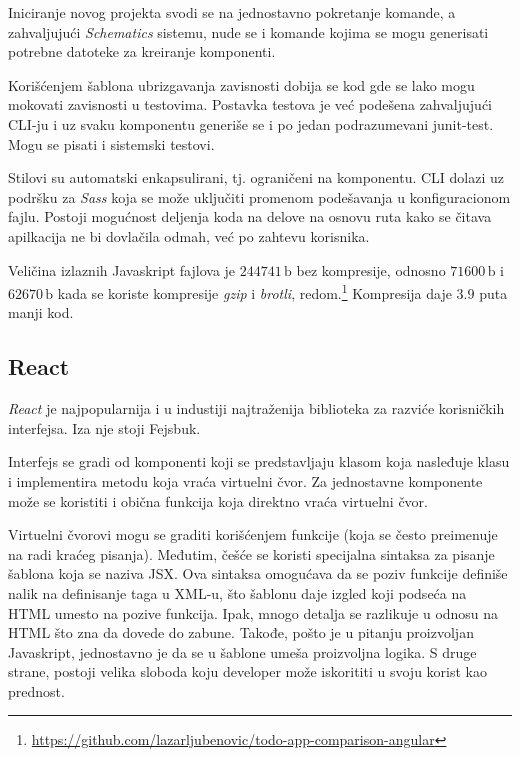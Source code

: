 Iniciranje novog projekta svodi se na jednostavno pokretanje komande, a zahvaljujući \textsl{Schematics} sistemu, nude se i komande kojima se mogu generisati potrebne datoteke za kreiranje komponenti.

Korišćenjem šablona ubrizgavanja zavisnosti dobija se kod gde se lako mogu mokovati zavisnosti u testovima.
Postavka testova je već podešena zahvaljujući CLI-ju i uz svaku komponentu generiše se i po jedan podrazumevani junit-test.
Mogu se pisati i sistemski testovi.

Stilovi su automatski enkapsulirani, tj. ograničeni na komponentu.
CLI dolazi uz podršku za \textsl{Sass} koja se može uključiti promenom podešavanja u konfiguracionom fajlu.
Postoji mogućnost deljenja koda na delove na osnovu ruta kako se čitava apilkacija ne bi dovlačila odmah, već po zahtevu korisnika.

Veličina izlaznih Javaskript fajlova je $244741\,\mathrm{b}$ bez kompresije, odnosno $71600\,\mathrm{b}$ i $62670\,\mathrm{b}$ kada se koriste kompresije \textsl{gzip} i \textsl{brotli}, redom.\footnote{\url{https://github.com/lazarljubenovic/todo-app-comparison-angular}} Kompresija daje $3.9$ puta manji kod.

\subsection{React}

\textsl{React} je najpopularnija i u industiji najtraženija biblioteka za razviće korisničkih interfejsa.
Iza nje stoji Fejsbuk.

Interfejs se gradi od komponenti koji se predstavljaju klasom koja nasleđuje klasu  i implementira metodu  koja vraća virtuelni čvor.
Za jednostavne komponente može se koristiti i obična funkcija koja direktno vraća virtuelni čvor.

Virtuelni čvorovi mogu se graditi korišćenjem funkcije  (koja se često preimenuje na  radi kraćeg pisanja).
Međutim, češće se koristi specijalna sintaksa za pisanje šablona koja se naziva JSX.
Ova sintaksa omogućava da se poziv funkcije definiše nalik na definisanje taga u XML-u, što šablonu daje izgled koji podseća na HTML umesto na pozive funkcija.
Ipak, mnogo detalja se razlikuje u odnosu na HTML što zna da dovede do zabune.
Takođe, pošto je u pitanju proizvoljan Javaskript, jednostavno je da se u šablone umeša proizvoljna logika.
S druge strane, postoji velika sloboda koju developer može iskorititi u svoju korist kao prednost.

